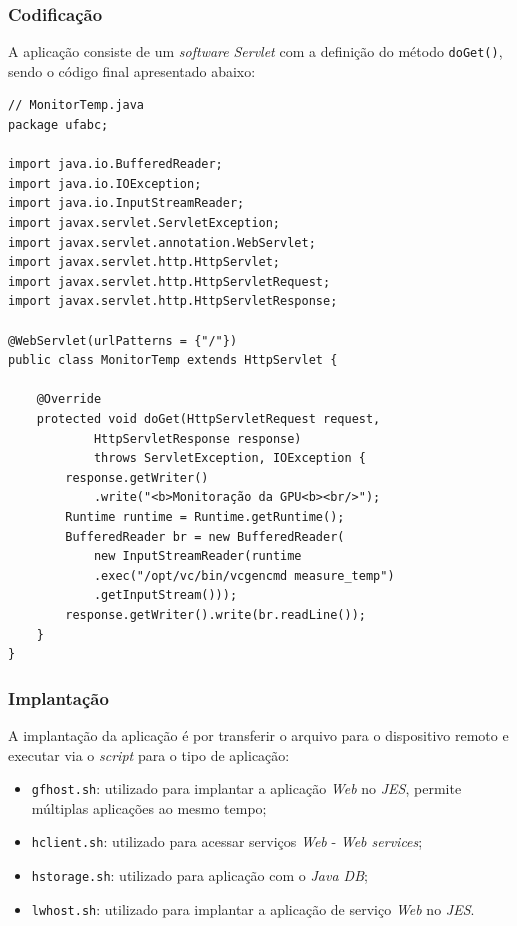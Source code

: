\subsubsection{Codificação}

A aplicação consiste de um \textit{software} \textit{Servlet} com a definição
do método \verb|doGet()|, sendo o código final apresentado abaixo:

\begin{verbatim}
// MonitorTemp.java
package ufabc;

import java.io.BufferedReader;
import java.io.IOException;
import java.io.InputStreamReader;
import javax.servlet.ServletException;
import javax.servlet.annotation.WebServlet;
import javax.servlet.http.HttpServlet;
import javax.servlet.http.HttpServletRequest;
import javax.servlet.http.HttpServletResponse;

@WebServlet(urlPatterns = {"/"})
public class MonitorTemp extends HttpServlet {

    @Override
    protected void doGet(HttpServletRequest request,
            HttpServletResponse response)
            throws ServletException, IOException {
        response.getWriter()
            .write("<b>Monitoração da GPU<b><br/>");
        Runtime runtime = Runtime.getRuntime();
        BufferedReader br = new BufferedReader(
            new InputStreamReader(runtime
            .exec("/opt/vc/bin/vcgencmd measure_temp")
            .getInputStream()));
        response.getWriter().write(br.readLine());
    }
}
\end{verbatim}

\subsubsection{Implantação}

A implantação da aplicação é por transferir o arquivo para o dispositivo remoto
e executar via o \textit{script} para o tipo de aplicação:

\begin{itemize}

    \item \verb|gfhost.sh|: utilizado para implantar a aplicação \textit{Web}
    no \textit{JES}, permite múltiplas aplicações ao mesmo tempo;

    \item \verb|hclient.sh|: utilizado para acessar serviços \textit{Web} -
    \textit{Web services};

    \item \verb|hstorage.sh|: utilizado para aplicação com o \textit{Java DB};

    \item \verb|lwhost.sh|: utilizado para implantar a aplicação de serviço
    \textit{Web} no \textit{JES}.

\end{itemize}

